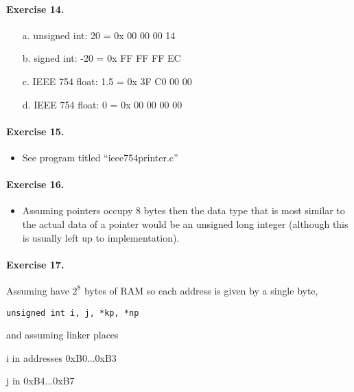 \documentclass[12pt]{article}
\begin{document}
\paragraph{Exercise 14.}

\begin{itemize}
    \item [a.]
    unsigned int: 20 = 0x 00 00 00 14

    \item [b.]
    signed int: -20 = 0x FF FF FF EC

    \item [c.]
    IEEE 754 float: 1.5 = 0x 3F C0 00 00

    \item [d.]
    IEEE 754 float: 0 = 0x 00 00 00 00

\end{itemize}

\paragraph{Exercise 15.}

\begin{itemize}
    \item 
    See program titled ``ieee754printer.c'' 
\end{itemize}

\paragraph{Exercise 16.}

\begin{itemize}
    \item 
    Assuming pointers occupy 8 bytes then the data type that is most similar to the actual data of a pointer would be an unsigned long integer (although this is usually left up to implementation).
\end{itemize}

\paragraph{Exercise 17.}

Assuming have $2^8$ bytes of RAM so each address is given by a single byte,

\verb|unsigned int i, j, *kp, *np|

and assuming linker places 

i in addresses 0xB0...0xB3

j in 0xB4...0xB7
\end{document}
